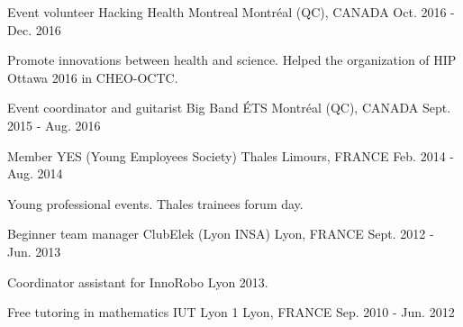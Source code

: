 


\begin{cventries}


\cventry
{Event volunteer} %
{Hacking Health Montreal} %
{\hspace{-5mm}Montréal (QC), CANADA} %
{Oct. 2016 - Dec. 2016} %
{ %
\begin{cvitems}
\item {Promote innovations between health and science. Helped the organization of HIP Ottawa 2016 in CHEO-OCTC.}
\end{cvitems}
}

\cventry
{Event coordinator and guitarist} %
{Big Band ÉTS} %
{\hspace{-5mm}Montréal (QC), CANADA} %
{Sept. 2015 - Aug. 2016} %
{ %
}

\vspace{-3mm}
\cventry
{Member} %
{YES (Young Employees Society) Thales} %
{Limours, FRANCE} %
{Feb. 2014 - Aug. 2014} %
{ %
\begin{cvitems}
\item {Young professional events. Thales trainees forum day.}
\end{cvitems}
}

\cventry
{Beginner team manager} %
{ClubElek (Lyon INSA)} %
{Lyon, FRANCE} %
{Sept. 2012 - Jun. 2013} %
{ %
\begin{cvitems}
\item{Coordinator assistant for InnoRobo Lyon 2013.}
\end{cvitems}
}

\cventry
{Free tutoring in mathematics} %
{IUT Lyon 1} %
{Lyon, FRANCE} %
{Sep. 2010 - Jun. 2012} %
{ %
}


\end{cventries}
